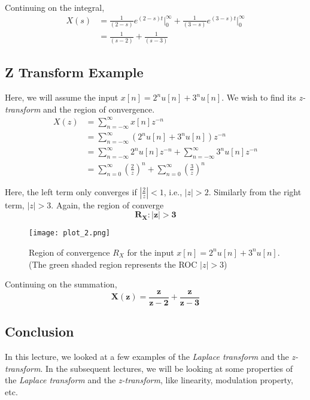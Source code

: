 Continuing on the integral, 
\begin{align*}
	X(s) &= \frac{1}{(2 - s)}e^{(2-s)t}\Big|_0^{\infty} + \frac{1}{(3-s)}e^{(3-s)t}\Big|_0^{\infty}\\
	&= \frac{1}{(s - 2)} + \frac{1}{(s - 3)}
\end{align*}

\subsection{Z Transform Example}
Here, we will assume the input $x[n] = 2^{n}u[n] + 3^{n}u[n]$. We wish to find its \textit{z-transform} and the region of convergence.
\begin{align*}
X(z) &= \sum_{n=-\infty}^{\infty}{x[n]z^{-n}}\\
&= \sum_{n=-\infty}^{\infty}{(2^{n}u[n] + 3^{n}u[n])z^{-n}}\\
&= \sum_{n=-\infty}^{\infty}{2^{n}u[n]z^{-n}} + \sum_{n=-\infty}^{\infty}{3^{n}u[n]z^{-n}}\\
&= \sum_{n=0}^{\infty}{{(\frac{2}{z})}^{n}} + \sum_{n=0}^{\infty}{{(\frac{3}{z})}^{n}}
\end{align*}

Here, the left term only converges if $|\frac{2}{z}| < 1$, i.e., $|z| > 2$. Similarly from the right term, $|z| > 3$. 
Again, the region of converge
\[
	\mathbf{R_X : |z| > 3}
\]

\begin{figure}[h!]
\begin{center}
\texttt{[image: plot\_2.png]}
\end{center}
\caption{Region of convergence $R_X$ for the input  $x[n] = 2^{n}u[n] + 3^{n}u[n]$. (The green shaded region represents the ROC $|z| > 3$)}
\end{figure}

Continuing on the summation,
\[
	\mathbf{X(z) = \frac{z}{z-2} + \frac{z}{z-3}}
\]


\subsection{Conclusion}
In this lecture, we looked at a few examples of the \textit{Laplace transform} and the \textit{z-transform}. In the subsequent lectures, we will be looking at some properties of the \textit{Laplace transform} and the \textit{z-transform}, like linearity, modulation property, etc.







                



                     
